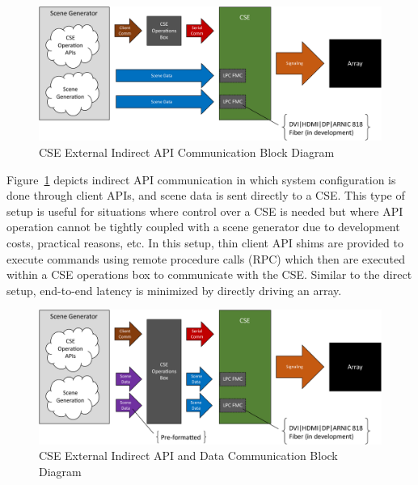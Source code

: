     \begin{figure}
        \centering
        \includegraphics[width=1.0\textwidth]{fig/external_cse_comm_half_indirect.pdf}
        \caption{CSE External Indirect API Communication Block Diagram}
        \label{fig:external_cse_comm_half_indirect}
    \end{figure}

    Figure~\ref{fig:external_cse_comm_half_indirect} depicts indirect API communication in which system configuration is done through client APIs, and scene data is sent directly to a CSE. This type of setup is useful for situations where control over a CSE is needed but where API operation cannot be tightly coupled with a scene generator due to development costs, practical reasons, etc. In this setup, thin client API shims are provided to execute commands using remote procedure calls (RPC) which then are executed within a CSE operations box to communicate with the CSE. Similar to the direct setup, end-to-end latency is minimized by directly driving an array.

    \begin{figure}
        \centering
        \includegraphics[width=1.0\textwidth]{fig/external_cse_comm_indirect.pdf}
        \caption{CSE External Indirect API and Data Communication Block Diagram}
        \label{fig:external_cse_comm_indirect}
    \end{figure}


